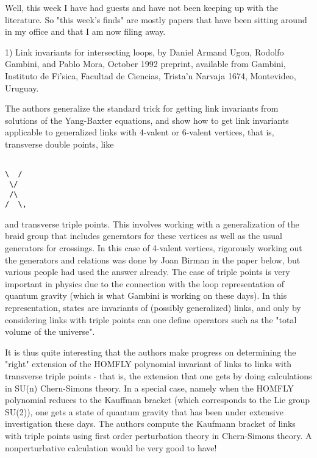 


Well, this week I have had guests and have not been keeping up with
the literature.  So "this week's finds" are mostly papers that have
been sitting around in my office and that I am now filing away.

1)   Link invariants for intersecting loops, by Daniel Armand Ugon,
Rodolfo Gambini, and Pablo Mora, October 1992 preprint, available
from Gambini, Instituto de Fi'sica, Facultad de Ciencias, 
Trista'n Narvaja 1674, Montevideo, Uruguay.  

The authors generalize the standard trick for getting link invariants
from solutions of the Yang-Baxter equations, and show how to get link
invariants applicable to generalized links with 4-valent or 6-valent
vertices, that is, transverse double points, like


\begin{verbatim}

\  /
 \/
 /\
/  \,
\end{verbatim}
    
and transverse triple points.  This involves 
working with a generalization of the braid group that includes
generators for these vertices as well as the usual generators for 
crossings.  In this case of 4-valent vertices, rigorously working out 
the generators and relations was done by Joan Birman in the paper below,
but various people had used the answer already.  The case of triple points
is very important in physics due to the connection with the loop 
representation of quantum gravity (which is what Gambini is working on 
these days).  In this representation, states are invariants of 
(possibly generalized) links, and only by considering links with 
triple points can one define operators such as the 
"total volume of the universe".  

It is thus quite interesting that the authors make progress on determining
the "right" extension of the HOMFLY polynomial invariant of
links to links with transverse triple points - that is, the
extension that one gets by doing calculations in SU(n) Chern-Simons theory.  
In a special case, namely when the HOMFLY polynomial reduces to the
Kauffman bracket (which corresponds to the Lie group SU(2)), one
gets a state of quantum gravity that has been under extensive investigation
these days.  The authors compute the Kaufmann bracket of links
with triple points using first order perturbation theory in Chern-Simons
theory.  A nonperturbative calculation would be very good to have!

